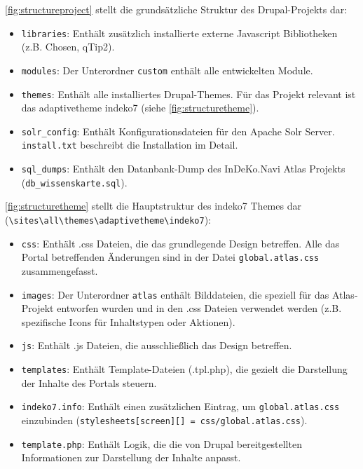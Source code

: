 \cref{fig:structureproject} stellt die grundsätzliche Struktur des Drupal-Projekts dar:
\begin{itemize}
	\item \lstinline|libraries|: Enthält zusätzlich installierte externe Javascript Bibliotheken (z.B. Chosen, qTip2).
	
	\item \lstinline|modules|: Der Unterordner \lstinline|custom| enthält alle entwickelten Module.
	
	\item \lstinline|themes|: Enthält alle installiertes Drupal-Themes. Für das Projekt relevant ist das adaptivetheme indeko7 (siehe \cref{fig:structuretheme}).
	
	\item \lstinline|solr_config|: Enthält Konfigurationsdateien für den Apache Solr Server. \lstinline|install.txt| beschreibt die Installation im Detail.
	
	\item \lstinline|sql_dumps|: Enthält den Datanbank-Dump des InDeKo.Navi Atlas Projekts  (\lstinline|db_wissenskarte.sql|).
\end{itemize}


\cref{fig:structuretheme} stellt die Hauptstruktur des indeko7 Themes dar (\lstinline|\sites\all\themes\adaptivetheme\indeko7|):
\begin{itemize}
	\item \lstinline|css|: Enthält .css Dateien, die das grundlegende Design betreffen. Alle das Portal betreffenden Änderungen sind in der Datei \lstinline|global.atlas.css| zusammengefasst.
	
	\item \lstinline|images|: Der Unterordner \lstinline|atlas| enthält Bilddateien, die speziell für das Atlas-Projekt entworfen wurden und in den .css Dateien verwendet werden (z.B. spezifische Icons für Inhaltstypen oder Aktionen).
	
	\item \lstinline|js|: Enthält .js Dateien, die ausschließlich das Design betreffen. 
	
	\item \lstinline|templates|: Enthält Template-Dateien (.tpl.php), die gezielt die Darstellung der Inhalte des Portals steuern.
	
	\item \lstinline|indeko7.info|: Enthält einen zusätzlichen Eintrag, um \lstinline|global.atlas.css| einzubinden (\lstinline|stylesheets[screen][] = css/global.atlas.css|).
	
	\item \lstinline|template.php|: Enthält Logik, die die von Drupal bereitgestellten Informationen zur Darstellung der Inhalte anpasst.
	
\end{itemize}



